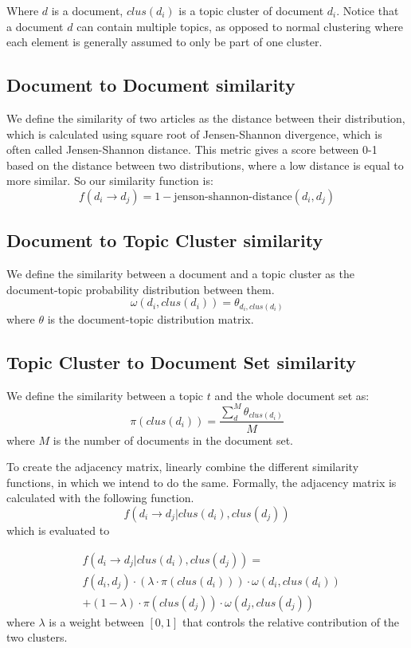 \noindent
Where $d$ is a document, $clus(d_i)$ is a topic cluster of document $d_i$.
Notice that a document $d$ can contain multiple topics, as opposed to normal clustering where each element is generally assumed to only be part of one cluster.

\subsection*{Document to Document similarity}
We define the similarity of two articles as the distance between their distribution, which is calculated using square root of Jensen-Shannon divergence, which is often called Jensen-Shannon distance\cite{jensen-shannon2003}\cite{jensen-shannondis2003}.
This metric gives a score between 0-1 based on the distance between two distributions, where a low distance is equal to more similar.
So our similarity function is:
$$ f(d_i \rightarrow d_j) = 1 - \text{jenson-shannon-distance}(d_i, d_j)$$ 

\subsection*{Document to Topic Cluster similarity}
We define the similarity between a document and a topic cluster as the document-topic probability distribution between them.
$$ \omega(d_i,clus(d_i)) = \theta_{d_i,clus(d_i)}$$
where $\theta$ is the document-topic distribution matrix.

\subsection*{Topic Cluster to Document Set similarity}
We define the similarity between a topic $t$ and the whole document set as:
$$ \pi(clus(d_i)) = \frac{\sum_{d}^{M} \theta_{clus(d_i)}}{M} $$
where $M$ is the number of documents in the document set.


To create the adjacency matrix, \cite{ClusterPageRank} linearly combine the different similarity functions, in which we intend to do the same.
Formally, the adjacency matrix is calculated with the following function.
$$ f(d_i \rightarrow d_j | clus(d_i), clus(d_j)) $$
which is evaluated to 

\begin{align*}
&f(d_i \rightarrow d_j | clus(d_i), clus(d_j)) = \\
&f(d_i, d_j) \cdot (\lambda \cdot \pi(clus(d_i))) \cdot \omega(d_i, clus(d_i)) \\ 
&+ (1-\lambda) \cdot \pi(clus(d_j)) \cdot \omega(d_j, clus(d_j))
\end{align*}
where $\lambda$ is a weight between $[0,1]$ that controls the relative contribution of the two clusters.